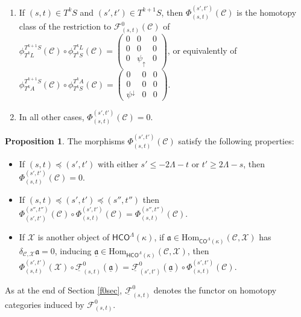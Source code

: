 \documentclass[11pt]{amsart}
\makeatletter
\def\namedlabel#1#2{\begingroup
	#2%
	\def\@currentlabel{#2}%
	\phantomsection\label{#1}\endgroup
}
\theoremstyle{definition}
\newtheorem{prop}[theorem]{Proposition}
\theoremstyle{remark}
\numberwithin{equation}{section}
\makeatother
\begin{document}
\begin{enumerate}
	\item[\namedlabel{(h)}{(h)}] If $(s,t)\in T^kS$ and $(s',t')\in T^{k+1}S$, then $\Phi_{(s,t)}^{(s',t')}(\mathcal{C})$  is the homotopy class of the restriction to $\mathcal{F}^{0}_{(s,t)}(\mathcal{C})$ of $\phi_{T^kL}^{T^{k+1}S}(\mathcal{C})\circ \phi_{T^kS}^{T^{k}L}(\mathcal{C})=\left(\begin{array}{ccc}0 & 0 & 0 \\ 0 & 0 & 0 \\ 0 & \psi_{\uparrow} & 0\end{array}\right)$, or equivalently of  $\phi_{T^kA}^{T^{k+1}S}(\mathcal{C})\circ \phi_{T^kS}^{T^{k}A}(\mathcal{C})=\left(\begin{array}{ccc}0 & 0 & 0 \\ 0 & 0 & 0 \\ \psi^{\downarrow} & 0  & 0\end{array}\right)$.
	\item[\namedlabel{(i)}{(i)}] In all other cases, $\Phi_{(s,t)}^{(s',t')}(\mathcal{C})=0$.
\end{enumerate}

\begin{prop}\label{mainnat}
	The morphisms  $\Phi_{(s,t)}^{(s',t')}(\mathcal{C})$ satisfy the following properties:
	\begin{itemize}
		\item[(I)] If $(s,t)\preceq (s',t')$ with either $s'\leq -2\Lambda-t$ or $t'\geq 2\Lambda-s$, then $\Phi_{(s,t)}^{(s',t')}(\mathcal{C})=0$.
		\item[(II)] If $(s,t)\preceq (s',t')\preceq (s'',t'')$ then $\Phi_{(s',t')}^{(s'',t'')}(\mathcal{C})\circ \Phi_{(s,t)}^{(s',t')}(\mathcal{C})=\Phi_{(s,t)}^{(s'',t'')}(\mathcal{C})$.
		\item[(III)] If $\mathcal{X}$ is another object of $\mathsf{HCO}^{\Lambda}(\kappa)$, if $\mathfrak{a}\in \mathrm{Hom}_{\mathsf{CO}^{\Lambda}(\kappa)}(\mathcal{C},\mathcal{X})$ has $\delta_{\mathcal{C},\mathcal{X}}\mathfrak{a}=0$, inducing $\underline{\mathfrak{a}}\in\mathrm{Hom}_{\mathsf{HCO}^{\Lambda}(\kappa)}(\mathcal{C},\mathcal{X})$, then $\Phi_{(s,t)}^{(s',t')}(\mathcal{X})\circ \underline{\mathcal{F}}_{(s,t)}^{0}(\underline{\mathfrak{a}})= \underline{\mathcal{F}}_{(s',t')}^{0}(\underline{\mathfrak{a}})\circ \Phi_{(s,t)}^{(s',t')}(\mathcal{C})$.
	\end{itemize}
\end{prop}

As at the end of Section \ref{f0sec}, $\underline{\mathcal{F}}_{(s,t)}^{0}$ denotes the functor on homotopy categories induced by $\mathcal{F}_{(s,t)}^{0}$.
\end{document}
